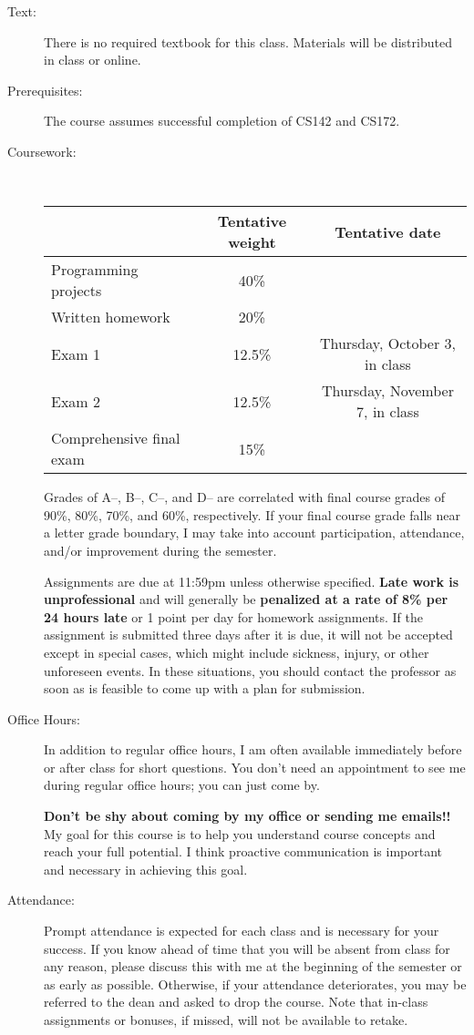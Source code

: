 \documentclass [letterpaper,11pt]{article}
\begin{document}
\begin{description}
\item[Text:]
   There is no required textbook for this class.  Materials will be distributed in class
   or online.  

\item[Prerequisites:]
The course assumes successful completion of CS142 and CS172.

\item[Coursework:] \

\begin{tabular}{lcc} 
& Tentative weight & Tentative date \\ \hline
Programming projects & 40\% & \\
Written homework & 20\% & \\
Exam 1 & 12.5\% & Thursday, October 3, in class  \\
Exam 2 & 12.5\% & Thursday, November 7, in class\\
Comprehensive final exam & 15\% & \\
\end{tabular}

Grades of A--, B--, C--, and D-- are correlated with final course grades of 90\%, 80\%,
70\%, and 60\%, respectively.  If your final course grade falls near a letter grade boundary,
I may take into account participation, attendance, and/or improvement during the semester.

Assignments are due at 11:59pm unless otherwise specified.  \textbf{Late work is unprofessional} and will generally be \textbf{penalized at a rate of 8\% per 24 hours late} or 1 point per day for homework assignments.  If the assignment is submitted three days after it is due, it will not be accepted except in special cases, which might include sickness, injury, or other unforeseen events. In these situations, you should contact the professor as soon as is feasible to come up with a plan for submission.

\item[Office Hours:]
In addition to regular office hours, I am often available immediately before or after class for 
short questions.  You don't need an appointment to see me during regular office hours; you
can just come by.  

\textbf{Don't be shy about coming by my office or sending me emails!!}  My goal for this course is to help you understand course concepts and reach your full potential. I think proactive communication is important and necessary in achieving this goal.

\item[Attendance:]
Prompt attendance is expected for each class and is necessary for your success. If you know ahead of time that you will be
absent from class for any reason, please discuss this with me at the beginning of the semester
or as early as possible. Otherwise, if your attendance deteriorates, you may be referred to the dean and asked to drop the course. Note that in-class assignments or bonuses, if missed, will not be available to retake.


\end{description}
\end{document}
